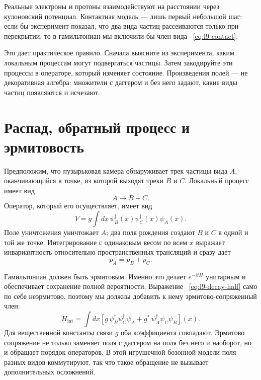 Реальные электроны и протоны взаимодействуют на расстоянии через кулоновский потенциал. Контактная модель — лишь первый небольшой шаг: если бы эксперимент показал, что два вида частиц рассеиваются только при перекрытии, то в гамильтониан мы включили бы член вида ~\eqref{eq:l9-contact}.

\begin{classroomqa}
\end{classroomqa}

Это дает практическое правило. Сначала выясните из эксперимента, каким локальным процессам могут подвергаться частицы. Затем закодируйте эти процессы в операторе, который изменяет состояние. Произведения полей — не декоративная алгебра: множители с даггером и без него задают, какие виды частиц появляются и исчезают.

\section{Распад, обратный процесс и эрмитовость}

Предположим, что пузырьковая камера обнаруживает трек частицы вида \(A\), оканчивающийся в точке, из которой выходят треки \(B\) и \(C\). Локальный процесс имеет вид
\begin{equation}
A\longrightarrow B+C.
\end{equation}
Оператор, который его осуществляет, имеет вид
\begin{equation}
V=g\int dx\,
\psi_B^\dagger(x)\psi_C^\dagger(x)\psi_A(x).
\label{eq:l9-decay-half}
\end{equation}
Поле уничтожения уничтожает \(A\); два поля рождения создают \(B\) и \(C\) в одной и той же точке. Интегрирование с одинаковым весом по всем \(x\) выражает инвариантность относительно пространственных трансляций и сразу дает
\begin{equation}
p_A=p_B+p_C.
\end{equation}

Гамильтониан должен быть эрмитовым. Именно это делает \(e^{-itH}\) унитарным и обеспечивает сохранение полной вероятности. Выражение ~\eqref{eq:l9-decay-half} само по себе неэрмитово, поэтому мы должны добавить к нему эрмитово-сопряженный член:
\begin{equation}
H_{\mathrm{int}}
=\int dx\left[
g\,\psi_B^\dagger\psi_C^\dagger\psi_A
+g^*\,\psi_A^\dagger\psi_C\psi_B
\right](x).
\label{eq:l9-hermitian-vertex}
\end{equation}
Для вещественной константы связи \(g\) оба коэффициента совпадают. Эрмитово сопряжение не только заменяет поля с даггером на поля без него и наоборот, но и обращает порядок операторов. В этой игрушечной бозонной модели поля разных видов коммутируют, так что такое обращение не вызывает дополнительных осложнений.

